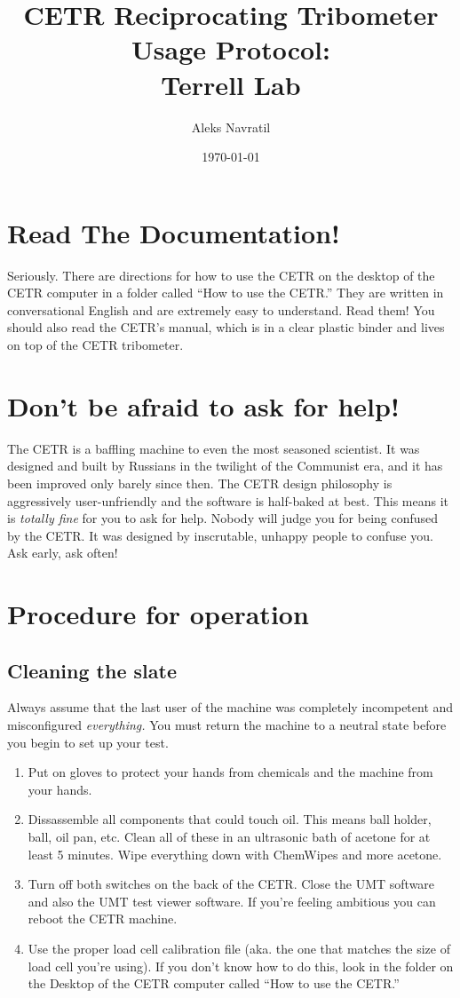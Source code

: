 \documentclass[10pt, letterpaper]{article}
\title{CETR Reciprocating Tribometer Usage Protocol: \\ Terrell Lab}
\author{Aleks Navratil}
\date{\today}
\begin{document}
\maketitle
\tableofcontents
\newpage
\section{Read The Documentation!}

Seriously. There are directions for how to use the CETR on the desktop of the CETR computer in a folder called ``How to use the CETR.'' They are written in conversational English and are extremely easy to understand. Read them! You should also read the CETR's manual, which is in a clear plastic binder and lives on top of the CETR tribometer.

\section{Don't be afraid to ask for help!}
The CETR is a baffling machine to even the most seasoned scientist. It was designed and built by Russians in the twilight of the Communist era, and it has been improved only barely since then. The CETR design philosophy is aggressively user-unfriendly and the software is half-baked at best. This means it is \emph{totally fine} for you to ask for help. Nobody will judge you for being confused by the CETR. It was designed by inscrutable, unhappy people to confuse you. Ask early, ask often!

\section{Procedure for operation}
\subsection{Cleaning the slate}
Always assume that the last user of the machine was completely incompetent and misconfigured \emph{everything.} You must return the machine to a neutral state before you begin to set up your test.
\begin{enumerate}
\item Put on gloves to protect your hands from chemicals and the machine from your hands.

\item Dissassemble all components that could touch oil. This means ball holder, ball, oil pan, etc. Clean all of these in an ultrasonic bath of acetone for at least 5 minutes. Wipe everything down with ChemWipes and more acetone.

\item Turn off both switches on the back of the CETR. Close the UMT software and also the UMT test viewer software. If you're feeling ambitious you can reboot the CETR machine.

\item Use the proper load cell calibration file (aka. the one that matches the size of load cell you're using). If you don't know how to do this, look in the folder on the Desktop of the CETR computer called ``How to use the CETR.''
\end{enumerate}
\end{document}
